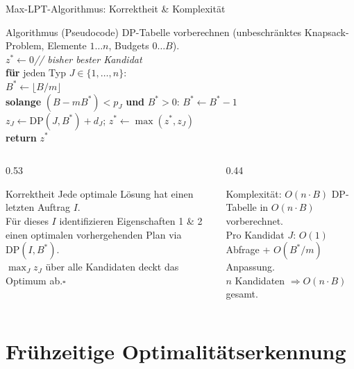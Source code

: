 \documentclass[fleqn,11pt,aspectratio=43]{beamer}
\begin{document}
\begin{frame}[shrink=45]{Max-LPT-Algorithmus: Korrektheit \& Komplexität}
  \begin{block}{Algorithmus (Pseudocode)}
    \small
    DP-Tabelle vorberechnen (unbeschränktes Knapsack-Problem, Elemente $1\ldots n$, Budgets $0\ldots B$).\\[0.2em]
    $z^*\leftarrow 0$\hfill\emph{// bisher bester Kandidat}\\
    \textbf{für} jeden Typ $J\in\{1,\ldots,n\}$:\\
    \qquad $B^*\leftarrow\lfloor B/m\rfloor$\\
    \qquad \textbf{solange} $(B-mB^*)<p_J$ \textbf{und} $B^*>0$:\; $B^*\leftarrow B^*-1$\\
    \qquad $z_J\leftarrow\mathrm{DP}(J,B^*)+d_J$;\; $z^*\leftarrow\max(z^*,z_J)$\\
    \textbf{return} $z^*$
  \end{block}
  \begin{columns}[T]
    \begin{column}{0.53\textwidth}
      \begin{block}{Korrektheit}
        \small
        Jede optimale Lösung hat einen letzten Auftrag $I$.\\[0.2em]
        Für dieses $I$ identifizieren Eigenschaften 1 \& 2 einen optimalen vorhergehenden Plan via $\mathrm{DP}(I,B^*)$.\\[0.2em]
        $\max_J z_J$ über alle Kandidaten deckt das Optimum ab.\hfill$\square$
      \end{block}
    \end{column}
    \begin{column}{0.44\textwidth}
      \begin{alertblock}{Komplexität: $O(n\cdot B)$}
        \small
        DP-Tabelle in $O(n\cdot B)$ vorberechnet.\\[0.2em]
        Pro Kandidat $J$: $O(1)$ Abfrage + $O(B^*/m)$ Anpassung.\\[0.2em]
        $n$ Kandidaten $\Rightarrow O(n\cdot B)$ gesamt.
      \end{alertblock}
    \end{column}
  \end{columns}
\end{frame}

\section{Frühzeitige Optimalitätserkennung}
\end{document}
